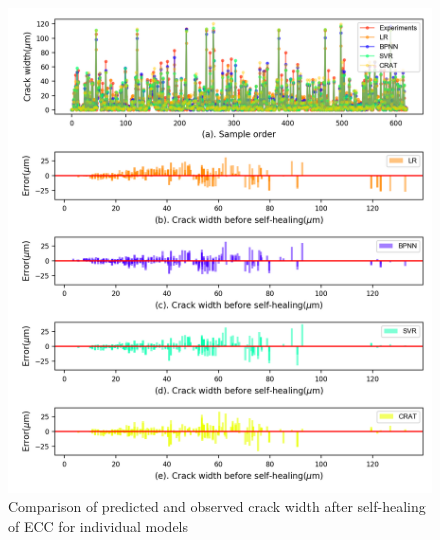 \documentclass[11pt]{article}
\begin{document}
		\begin{figure}[!h]
		\centering
		\includegraphics[width=\textwidth]{error.png}
		\caption{Comparison of predicted and observed crack width after self-healing of ECC for individual models}
		\label{error1}
	\end{figure}
	
\end{document}
